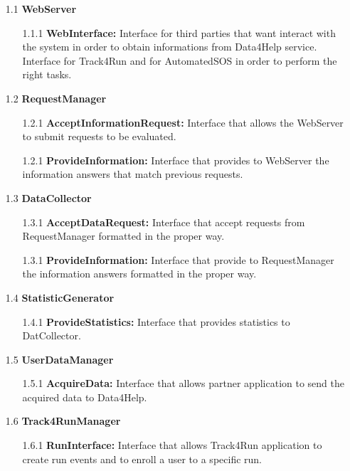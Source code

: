 \begin{enumerate}
\item[1.1] \textbf{WebServer}
	\begin{enumerate}
		\item[1.1.1] \textbf{WebInterface:} Interface for third parties that want interact with the system in order to obtain informations from Data4Help service. Interface for Track4Run and for AutomatedSOS in order to perform the right tasks.
	\end{enumerate}
	
\item[1.2] \textbf{RequestManager}
	\begin{enumerate}
		\item[1.2.1] \textbf{AcceptInformationRequest:} Interface that allows the WebServer to submit requests to be evaluated.
		\item[1.2.1] \textbf{ProvideInformation:} Interface that provides to WebServer the information answers that match previous requests.
	\end{enumerate}

\item[1.3] \textbf{DataCollector}
	\begin{enumerate}
		\item[1.3.1] \textbf{AcceptDataRequest:} Interface that accept requests from RequestManager formatted in the proper way.
		\item[1.3.1] \textbf{ProvideInformation:} Interface that provide to RequestManager the information answers formatted in the proper way.
	\end{enumerate}
	
\item[1.4] \textbf{StatisticGenerator}
	\begin{enumerate}
		\item[1.4.1] \textbf{ProvideStatistics:} Interface that provides statistics to DatCollector.
	\end{enumerate}
	
\item[1.5] \textbf{UserDataManager}
	\begin{enumerate}
		\item[1.5.1] \textbf{AcquireData:} Interface that allows partner application to send the acquired data to Data4Help.
	\end{enumerate}

\item[1.6] \textbf{Track4RunManager}
	\begin{enumerate}
		\item[1.6.1] \textbf{RunInterface:} Interface that allows Track4Run application to create run events and to enroll a user to a specific run. 
	\end{enumerate}
	

\end{enumerate}
